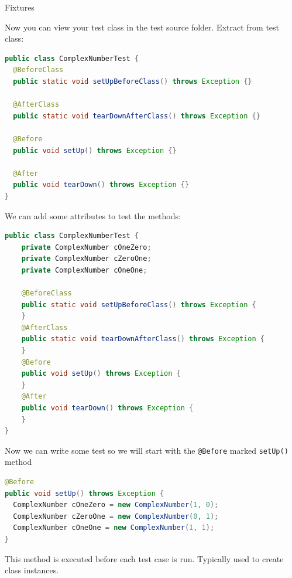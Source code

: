 \documentclass[11pt, xcolor=svgnames]{beamer}
\begin{document}

\begin{frame}[fragile]{Fixtures}

Now you can view your test class in the test source folder. Extract from test class:

\begin{center}
\begin{lstlisting}[language=Java,basicstyle=\scriptsize]
public class ComplexNumberTest {
  @BeforeClass
  public static void setUpBeforeClass() throws Exception {}

  @AfterClass
  public static void tearDownAfterClass() throws Exception {}

  @Before
  public void setUp() throws Exception {}

  @After
  public void tearDown() throws Exception {}
}
\end{lstlisting}
\end{center}

\end{frame}

% 
\begin{frame}[fragile]


We can add some attributes to test the methods:
\begin{center}
\begin{lstlisting}[language=Java,basicstyle=\tiny]
public class ComplexNumberTest {
	private ComplexNumber cOneZero;
	private ComplexNumber cZeroOne;
	private ComplexNumber cOneOne;

	@BeforeClass
	public static void setUpBeforeClass() throws Exception {
	}
	@AfterClass
	public static void tearDownAfterClass() throws Exception {
	}
	@Before
	public void setUp() throws Exception {
	}
	@After
	public void tearDown() throws Exception {
	}
}
\end{lstlisting}
\end{center}
\end{frame}


\begin{frame}[fragile]

Now we can write some test so we will start with the \texttt{@Before} marked \texttt{setUp()} method

\begin{lstlisting}[language=Java,basicstyle=\tiny]
@Before
public void setUp() throws Exception {
  ComplexNumber cOneZero = new ComplexNumber(1, 0);
  ComplexNumber cZeroOne = new ComplexNumber(0, 1);
  ComplexNumber cOneOne = new ComplexNumber(1, 1);
}
\end{lstlisting}	
This method is executed before each test case is run. Typically used to create class instances.
\end{frame}
\end{document}
